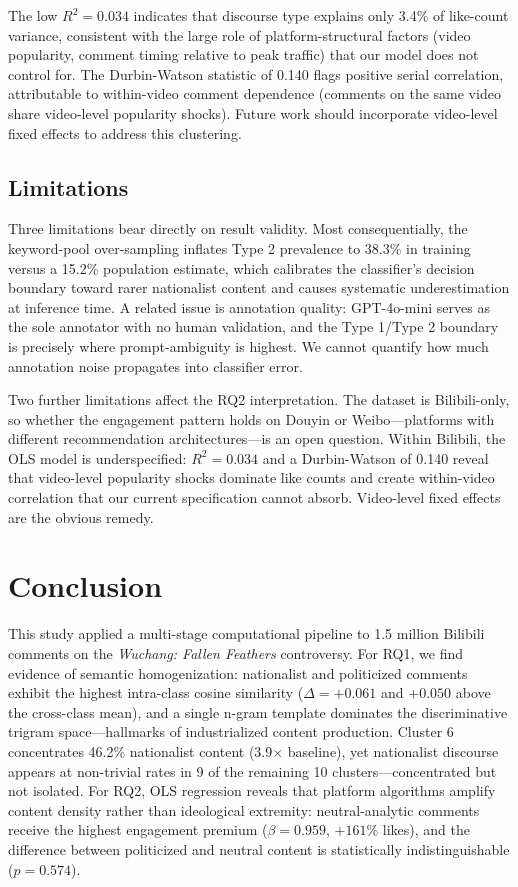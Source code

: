 \documentclass[letterpaper]{article}
\begin{document}
The low $R^2 = 0.034$ indicates that discourse type explains only 3.4\% of like-count variance, consistent with the large role of platform-structural factors (video popularity, comment timing relative to peak traffic) that our model does not control for. The Durbin-Watson statistic of 0.140 flags positive serial correlation, attributable to within-video comment dependence (comments on the same video share video-level popularity shocks). Future work should incorporate video-level fixed effects to address this clustering.

\subsection{Limitations}
\label{sec:limits}

Three limitations bear directly on result validity. Most consequentially, the keyword-pool over-sampling inflates Type 2 prevalence to 38.3\% in training versus a 15.2\% population estimate, which calibrates the classifier's decision boundary toward rarer nationalist content and causes systematic underestimation at inference time. A related issue is annotation quality: GPT-4o-mini serves as the sole annotator with no human validation, and the Type 1/Type 2 boundary is precisely where prompt-ambiguity is highest. We cannot quantify how much annotation noise propagates into classifier error.

Two further limitations affect the RQ2 interpretation. The dataset is Bilibili-only, so whether the engagement pattern holds on Douyin or Weibo---platforms with different recommendation architectures---is an open question. Within Bilibili, the OLS model is underspecified: $R^2 = 0.034$ and a Durbin-Watson of 0.140 reveal that video-level popularity shocks dominate like counts and create within-video correlation that our current specification cannot absorb. Video-level fixed effects are the obvious remedy.

\section{Conclusion}

This study applied a multi-stage computational pipeline to 1.5 million Bilibili comments on the \textit{Wuchang: Fallen Feathers} controversy. For RQ1, we find evidence of semantic homogenization: nationalist and politicized comments exhibit the highest intra-class cosine similarity ($\Delta = +0.061$ and $+0.050$ above the cross-class mean), and a single n-gram template dominates the discriminative trigram space---hallmarks of industrialized content production. Cluster 6 concentrates 46.2\% nationalist content (3.9$\times$ baseline), yet nationalist discourse appears at non-trivial rates in 9 of the remaining 10 clusters---concentrated but not isolated. For RQ2, OLS regression reveals that platform algorithms amplify content density rather than ideological extremity: neutral-analytic comments receive the highest engagement premium ($\beta = 0.959$, $+161\%$ likes), and the difference between politicized and neutral content is statistically indistinguishable ($p = 0.574$).
\end{document}
